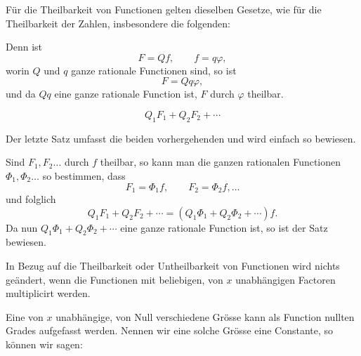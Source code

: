 
Für die Theilbarkeit von Functionen gelten dieselben Gesetze, wie für die Theilbarkeit der Zahlen, insbesondere die folgenden:


Denn ist
\[
 F=Qf,
 \qquad
 f=q\varphi,
\]
worin $Q$ und $q$ ganze rationale Functionen sind, so ist
\[
 F=Qq\varphi,
\]
und da $Qq$ eine ganze rationale Function ist, $F$ durch $\varphi$ theilbar.



\[
 Q_1F_1+Q_2F_2+\cdots
\]

Der letzte Satz umfasst die beiden vorhergehenden und wird einfach so bewiesen.

Sind $F_1,F_2\ldots$ durch $f$ theilbar, so kann man die ganzen rationalen Functionen $\Phi_1,\Phi_2\ldots$ so bestimmen, dass
\[
 F_1=\Phi_1f,\qquad F_2=\Phi_2f,\ldots
\]
und folglich
\[
 Q_1F_1+Q_2F_2+\cdots=(Q_1\Phi_1+Q_2\Phi_2+\cdots)f.
\]
Da nun $Q_1\Phi_1+Q_2\Phi_2+\cdots$ eine ganze rationale Function ist, so ist der Satz bewiesen.


In Bezug auf die Theilbarkeit oder Untheilbarkeit von Functionen wird nichts geändert, wenn die Functionen mit beliebigen, von $x$ unabhängigen Factoren multiplicirt werden.

Eine von $x$ unabhängige, von Null verschiedene Grösse kann als Function nullten Grades aufgefasst werden. Nennen wir eine solche Grösse eine Constante, so können wir sagen:

